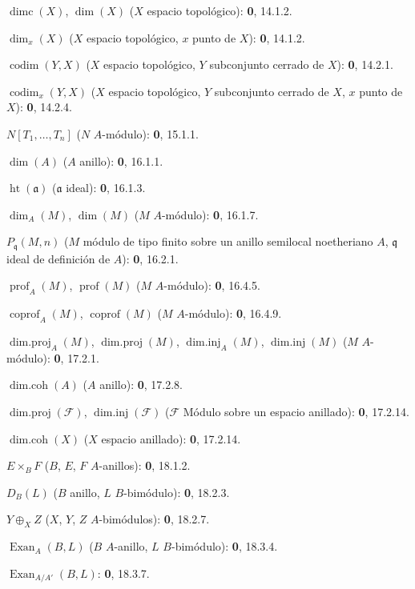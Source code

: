 $\operatorname{dimc}(X)$, $\dim(X)$ ($X$ espacio topológico): \textbf{0}, 14.1.2.\par
$\dim_x(X)$ ($X$ espacio topológico, $x$ punto de $X$): \textbf{0}, 14.1.2.\par
$\operatorname{codim}(Y,X)$ ($X$ espacio topológico, $Y$ subconjunto cerrado de $X$): \textbf{0}, 14.2.1.\par
$\operatorname{codim}_x(Y,X)$ ($X$ espacio topológico, $Y$ subconjunto cerrado de $X$, $x$ punto de $X$): \textbf{0}, 14.2.4.\par
$N[T_1,\ldots,T_n]$ ($N$ $A$-módulo): \textbf{0}, 15.1.1.\par
$\dim(A)$ ($A$ anillo): \textbf{0}, 16.1.1.\par
$\operatorname{ht}(\mathfrak a)$ ($\mathfrak a$ ideal): \textbf{0}, 16.1.3.\par
$\dim_A(M)$, $\dim(M)$ ($M$ $A$-módulo): \textbf{0}, 16.1.7.\par
$P_{\mathfrak q}(M,n)$ ($M$ módulo de tipo finito sobre un anillo semilocal noetheriano $A$, $\mathfrak q$ ideal de definición de $A$): \textbf{0}, 16.2.1.\par
$\operatorname{prof}_A(M)$, $\operatorname{prof}(M)$ ($M$ $A$-módulo): \textbf{0}, 16.4.5.\par
$\operatorname{coprof}_A(M)$, $\operatorname{coprof}(M)$ ($M$ $A$-módulo): \textbf{0}, 16.4.9.\par
$\operatorname{dim.proj}_A(M)$, $\operatorname{dim.proj}(M)$,
$\operatorname{dim.inj}_A(M)$, $\operatorname{dim.inj}(M)$ ($M$ $A$-módulo): \textbf{0}, 17.2.1.\par
$\operatorname{dim.coh}(A)$ ($A$ anillo): \textbf{0}, 17.2.8.\par
$\operatorname{dim.proj}(\mathscr F)$, $\operatorname{dim.inj}(\mathscr F)$
($\mathscr F$ Módulo sobre un espacio anillado): \textbf{0}, 17.2.14.\par
$\operatorname{dim.coh}(X)$ ($X$ espacio anillado): \textbf{0}, 17.2.14.\par
$E\times_B F$ ($B$, $E$, $F$ $A$-anillos): \textbf{0}, 18.1.2.\par
$D_B(L)$ ($B$ anillo, $L$ $B$-bimódulo): \textbf{0}, 18.2.3.\par
$Y\oplus_X Z$ ($X$, $Y$, $Z$ $A$-bimódulos): \textbf{0}, 18.2.7.\par
$\operatorname{Exan}_A(B,L)$ ($B$ $A$-anillo, $L$ $B$-bimódulo): \textbf{0}, 18.3.4.\par
$\operatorname{Exan}_{A/A'}(B,L)$: \textbf{0}, 18.3.7.\par
